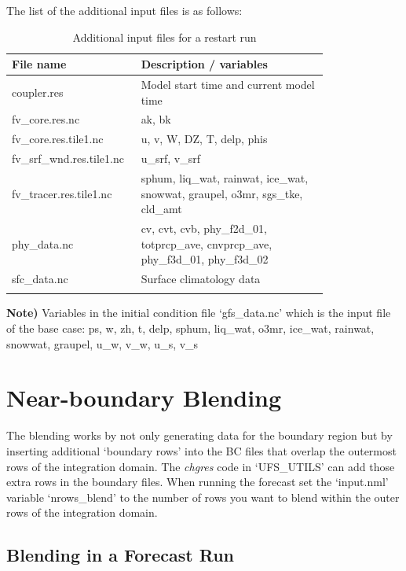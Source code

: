 \documentclass[11pt,fleqn]{report}              %
\begin{document}
\begin{enumerate}
The list of the additional input files is as follows:
{
\fontsize{10}{12}\selectfont
\begin{longtable}{p{0.25\linewidth} | p{0.55\linewidth} }
\hline
\hline
 File name & Description / variables \\
\hline
 coupler.res & Model start time and current model time \\
 fv\_core.res.nc & ak, bk \\
 fv\_core.res.tile1.nc & u, v, W, DZ, T, delp, phis\\
 fv\_srf\_wnd.res.tile1.nc & u\_srf, v\_srf \\
 fv\_tracer.res.tile1.nc & sphum, liq\_wat, rainwat, ice\_wat, snowwat, graupel, o3mr, sgs\_tke, cld\_amt \\
 phy\_data.nc & cv, cvt, cvb, phy\_f2d\_01, totprcp\_ave, cnvprcp\_ave, phy\_f3d\_01, phy\_f3d\_02 \\
 sfc\_data.nc & Surface climatology data \\
\hline
\caption{Additional input files for a restart run}
\label{table:add_input_restart}
\end{longtable}
}

{\bf Note)} Variables in the initial condition file `gfs\_data.nc' which is the input file of the base case: ps, w, zh, t, delp, sphum, liq\_wat, o3mr, ice\_wat, rainwat, snowwat, graupel, u\_w, v\_w, u\_s, v\_s

\end{enumerate}





\section{Near-boundary Blending}
\label{sec:dev_sar_blend}

The blending works by not only generating data for the boundary region but by inserting additional `boundary rows' into the BC files that overlap the outermost rows of the integration domain. The {\it chgres} code in `UFS\_UTILS' can add those extra rows in the boundary files. When running the forecast set the `input.nml' variable `nrows\_blend' to the number of rows you want to blend within the outer rows of the integration domain.

\subsection{Blending in a Forecast Run}
\end{document}
